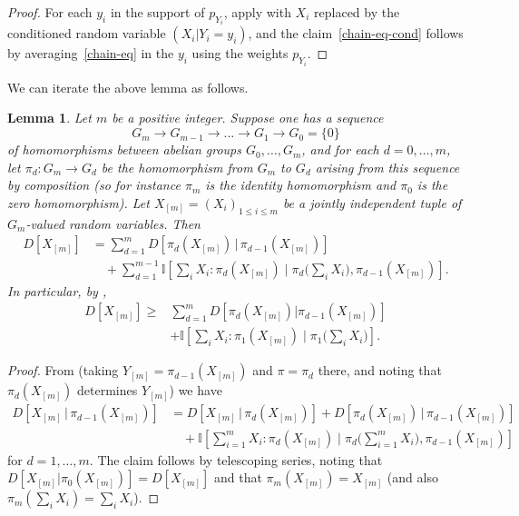 \documentclass[10pt,a4paper]{article}
\newtheorem{lemma}[theorem]{Lemma}
\newcommand{\lean}[1]{}
\newcommand{\uses}[1]{}
\newcommand{\leanok}{}
\newcommand{\bbI}{\mathbb{I}}
\begin{document}
  \begin{proof}\uses{multidist-chain-rule}\leanok
  For each $y_i$ in the support of $p_{Y_i}$, apply  with $X_i$ replaced by the conditioned random variable $(X_i|Y_i=y_i)$, and the claim~\eqref{chain-eq-cond} follows by averaging~\eqref{chain-eq} in the $y_i$ using the weights $p_{Y_i}$.
  \end{proof}

  We can iterate the above lemma as follows.

  \begin{lemma}\label{multidist-chain-rule-iter}\lean{iter_multiDist_chainRule,iter_multiDist_chainRule'}\leanok  Let $m$ be a positive integer.
    Suppose one has a sequence
    \begin{equation}\label{g-seq}
      G_m \to G_{m-1} \to \dots \to G_1 \to G_0 = \{0\}
    \end{equation}
    of homomorphisms between abelian groups $G_0,\dots,G_m$, and for each $d=0,\dots,m$, let $\pi_d : G_m \to G_d$ be the homomorphism from $G_m$ to $G_d$ arising from this sequence by composition (so for instance $\pi_m$ is the identity homomorphism and $\pi_0$ is the zero homomorphism).
    Let $X_{[m]} = (X_i)_{1 \leq i \leq m}$ be a jointly independent tuple of $G_m$-valued random variables.
    Then
    \begin{equation}
      \begin{split}
        D[ X_{[m]} ] &=  \sum_{d=1}^m D[ \pi_d(X_{[m]}) \,|\, \pi_{d-1}(X_{[m]})] \\
         &\quad + \sum_{d=1}^{m-1} \bbI[ \sum_i X_i : \pi_d(X_{[m]}) \; \big| \; \pi_d\big(\sum_i X_i\big), \pi_{d-1}(X_{[m]}) ].
      \end{split}\label{chain-eq-cond'}
    \end{equation}
    In particular, by ,
    \begin{align}\nonumber
        D[ X_{[m]} ] \geq  & \sum_{d=1}^m D[ \pi_d(X_{[m]})|\pi_{d-1}(X_{[m]}) ] \\
         & + \bbI[ \sum_i X_i : \pi_1(X_{[m]}) \; \big| \; \pi_1\bigl(\sum_i X_i\bigr) ].\label{chain-eq-cond''}
    \end{align}
  \end{lemma}

  \begin{proof}\uses{multidist-chain-rule-cond, conditional-nonneg}\leanok
  From  (taking $Y_{[m]} = \pi_{d-1}(X_{[m]})$ and $\pi = \pi_d$ there, and noting that $\pi_d(X_{[m]})$ determines $Y_{[m]}$) we have
  \begin{align*}
    D[ X_{[m]} \,|\, \pi_{d-1}(X_{[m]}) ] &=  D[ X_{[m]} \,|\, \pi_d(X_{[m]}) ] + D[  \pi_d(X_{[m]})\,|\,\pi_{d-1}(X_{[m]}) ] \\
                                             &\quad + \bbI[ \sum_{i=1}^m X_i : \pi_d(X_{[m]}) \; \big| \; \pi_d\bigl(\sum_{i=1}^m X_i\bigr), \pi_{d-1}(X_{[m]}) ]
  \end{align*}
  for $d=1,\dots,m$. The claim follows by telescoping series, noting that $D[X_{[m]} | \pi_0(X_{[m]})] = D[X_{[m]}]$ and that $\pi_m(X_{[m]})=X_{[m]}$ (and also $\pi_m( \sum_i X_i ) = \sum_i X_i$).
  \end{proof}
\end{document}
